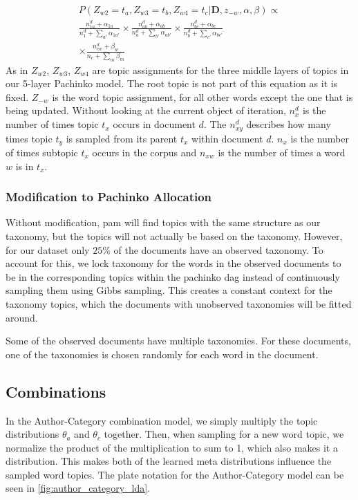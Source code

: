 \begin{equation}\label{eq:pachinko_gibbs}
	\begin{split}
		P(Z_{w2} = t_a, Z_{w3} = t_b, Z_{w4} = t_c | \textbf{D}, z_{-w}, \alpha, \beta) \propto \\
		\frac{n_{1a}^d + \alpha_{1a}}{n_1^d + \sum_{a'} \alpha_{1a'}} \times
		\frac{n_{ab}^d + \alpha_{ab}}{n_a^d + \sum_{b'} \alpha_{ab'}}  \times 
		\frac{n_{bc}^d + \alpha_{bc}}{n_{b}^d + \sum_{c'} \alpha_{bc'}} \\ \times 
		\frac{n_{cw}^d + \beta_{w}}{n_{c} + \sum_{m} \beta_{m}} 
	\end{split}
\end{equation}
As in \citet{li2006pachinko} $Z_{w2}$, $Z_{w3}$, $Z_{w4}$ are topic assignments for the three middle layers of topics in our 5-layer Pachinko model.
The root topic is not part of this equation as it is fixed.
$Z_{-w}$ is the word topic assignment, for all other words except the one that is being updated.
Without looking at the current object of iteration, $n_x^d$ is the number of times topic $t_x$ occurs in document $d$. 
The $n_{xy}^d$ describes how many times topic $t_y$ is sampled from its parent $t_x$ within document $d$.
$n_x$ is the number of times subtopic $t_x$ occurs in the corpus and $n_{xw}$ is the number of times a word $w$ is in $t_x$.





\subsubsection{Modification to Pachinko Allocation}\label{subsec:mod_pachinko}
Without modification, \gls{pam} will find topics with the same structure as our taxonomy, but the topics will not actually be based on the taxonomy.
However, for our dataset only $25\%$ of the documents have an observed taxonomy.
To account for this, we lock taxonomy for the words in the observed documents to be in the corresponding topics within the pachinko \gls{dag} instead of continuously sampling them using Gibbs sampling.
This creates a constant context for the taxonomy topics, which the documents with unobserved taxonomies will be fitted around.

Some of the observed documents have multiple taxonomies.
For these documents, one of the taxonomies is chosen randomly for each word in the document.

\subsection{Combinations}
In the Author-Category combination model, we simply multiply the topic distributions $\theta_a$ and $\theta_c$ together.
Then, when sampling for a new word topic, we normalize the product of the multiplication to sum to 1, which also makes it a distribution.
This makes both of the learned meta distributions influence the sampled word topics.
The plate notation for the Author-Category model can be seen in \autoref{fig:author_category_lda}.
